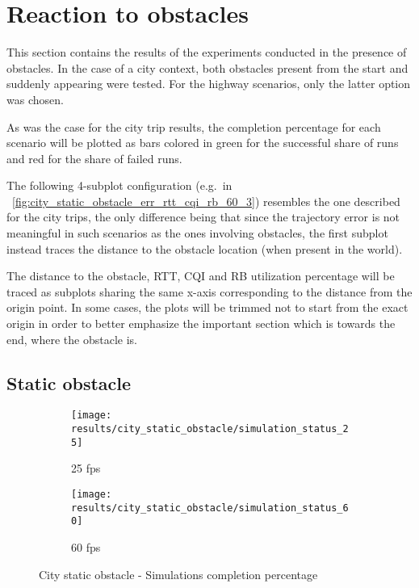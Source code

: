 







\pagebreak

\section{Reaction to obstacles}
This section contains the results of the experiments conducted in the presence of obstacles. In the case of a city context, both obstacles present from the start and suddenly appearing were tested. For the highway scenarios, only the latter option was chosen.

As was the case for the city trip results, the completion percentage for each scenario will be plotted as bars colored in green for the successful share of runs and red for the share of failed runs.

The following 4-subplot configuration (e.g.\ in \figurename~\ref{fig:city_static_obstacle_err_rtt_cqi_rb_60_3}) resembles the one described for the city trips, the only difference being that since the trajectory error is not meaningful in such scenarios as the ones involving obstacles, the first subplot instead traces the distance to the obstacle location (when present in the world).

The distance to the obstacle, RTT, CQI and RB utilization percentage will be traced as subplots sharing the same x-axis corresponding to the distance from the origin point. In some cases, the plots will be trimmed not to start from the exact origin in order to better emphasize the important section which is towards the end, where the obstacle is.


\subsection{Static obstacle}

\begin{figure}[H]
    \centering
    \begin{subfigure}[b]{0.95\textwidth}
        \centering
        \texttt{[image: results/city\_static\_obstacle/simulation\_status\_25]}
        \caption{25 fps}
    \end{subfigure}
    \hfill
    \begin{subfigure}[b]{0.95\textwidth}
        \centering
        \texttt{[image: results/city\_static\_obstacle/simulation\_status\_60]}
        \caption{60 fps}
    \end{subfigure}
    \caption{City static obstacle - Simulations completion percentage}
    \label{fig:city_static_obstacle_completion_percentage}
\end{figure}

